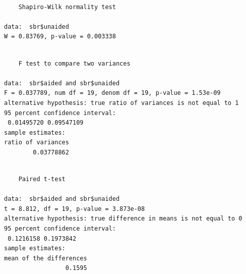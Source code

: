 \documentclass[
  letterpaper,
  DIV=11,
  numbers=noendperiod]{scrreprt}
\newenvironment{Shaded}{\begin{snugshade}}{\end{snugshade}}
\newcommand{\AttributeTok}[1]{\textcolor[rgb]{0.40,0.45,0.13}{#1}}
\newcommand{\CommentTok}[1]{\textcolor[rgb]{0.37,0.37,0.37}{#1}}
\newcommand{\ConstantTok}[1]{\textcolor[rgb]{0.56,0.35,0.01}{#1}}
\newcommand{\FunctionTok}[1]{\textcolor[rgb]{0.28,0.35,0.67}{#1}}
\newcommand{\NormalTok}[1]{\textcolor[rgb]{0.00,0.23,0.31}{#1}}
\newcommand{\SpecialCharTok}[1]{\textcolor[rgb]{0.37,0.37,0.37}{#1}}
\begin{document}
\begin{verbatim}

    Shapiro-Wilk normality test

data:  sbr$unaided
W = 0.83769, p-value = 0.003338
\end{verbatim}

\begin{Shaded}
\end{Shaded}

\begin{verbatim}

    F test to compare two variances

data:  sbr$aided and sbr$unaided
F = 0.037789, num df = 19, denom df = 19, p-value = 1.53e-09
alternative hypothesis: true ratio of variances is not equal to 1
95 percent confidence interval:
 0.01495720 0.09547109
sample estimates:
ratio of variances 
        0.03778862 
\end{verbatim}

\begin{Shaded}
\end{Shaded}

\begin{verbatim}

    Paired t-test

data:  sbr$aided and sbr$unaided
t = 8.812, df = 19, p-value = 3.873e-08
alternative hypothesis: true difference in means is not equal to 0
95 percent confidence interval:
 0.1216158 0.1973842
sample estimates:
mean of the differences 
                 0.1595 
\end{verbatim}

\begin{Shaded}
\end{Shaded}
\end{document}
